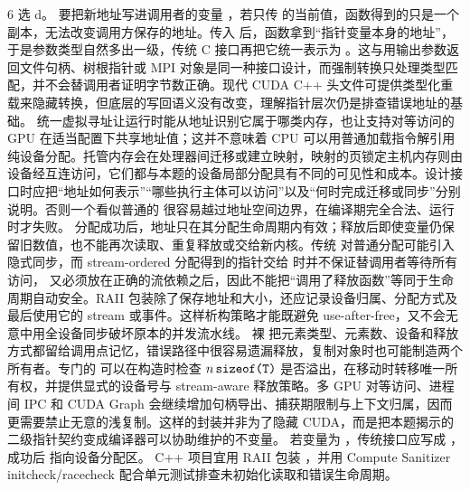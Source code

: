 \begin{solutionexercise}{6}
\conclusionheading 选 d。
\discussionheading
{}
 要把新地址写进调用者的变量 ，若只传  的当前值，函数得到的只是一个副本，无法改变调用方保存的地址。传入  后，函数拿到“指针变量本身的地址”，于是参数类型自然多出一级，传统 C 接口再把它统一表示为 。这与用输出参数返回文件句柄、树根指针或 MPI 对象是同一种接口设计，而强制转换只处理类型匹配，并不会替调用者证明字节数正确。现代 CUDA C++ 头文件可提供类型化重载来隐藏转换，但底层的写回语义没有改变，理解指针层次仍是排查错误地址的基础。
统一虚拟寻址让运行时能从地址识别它属于哪类内存，也让支持对等访问的 GPU 在适当配置下共享地址值；这并不意味着 CPU 可以用普通加载指令解引用纯设备分配。托管内存会在处理器间迁移或建立映射，映射的页锁定主机内存则由设备经互连访问，它们都与本题的设备局部分配具有不同的可见性和成本。设计接口时应把“地址如何表示”“哪些执行主体可以访问”以及“何时完成迁移或同步”分别说明。否则一个看似普通的  很容易越过地址空间边界，在编译期完全合法、运行时才失败。
分配成功后，地址只在其分配生命周期内有效；释放后即使变量仍保留旧数值，也不能再次读取、重复释放或交给新内核。传统  对普通分配可能引入隐式同步，而 stream-ordered 分配得到的指针交给  时并不保证替调用者等待所有访问， 又必须放在正确的流依赖之后，因此不能把“调用了释放函数”等同于生命周期自动安全。RAII 包装除了保存地址和大小，还应记录设备归属、分配方式及最后使用它的 stream 或事件。这样析构策略才能既避免 use-after-free，又不会无意中用全设备同步破坏原本的并发流水线。
裸  把元素类型、元素数、设备和释放方式都留给调用点记忆，错误路径中很容易遗漏释放，复制对象时也可能制造两个所有者。专门的  可以在构造时检查 $n\,\code{sizeof(T)}$ 是否溢出，在移动时转移唯一所有权，并提供显式的设备号与 stream-aware 释放策略。多 GPU 对等访问、进程间 IPC 和 CUDA Graph 会继续增加句柄导出、捕获期限制与上下文归属，因而更需要禁止无意的浅复制。这样的封装并非为了隐藏 CUDA，而是把本题揭示的二级指针契约变成编译器可以协助维护的不变量。
\variantheading 若变量为 ，传统接口应写成 ，成功后  指向设备分配区。
\practiceheading C++ 项目宜用 RAII 包装 ，并用 Compute Sanitizer initcheck/racecheck 配合单元测试排查未初始化读取和错误生命周期。
\end{solutionexercise}

